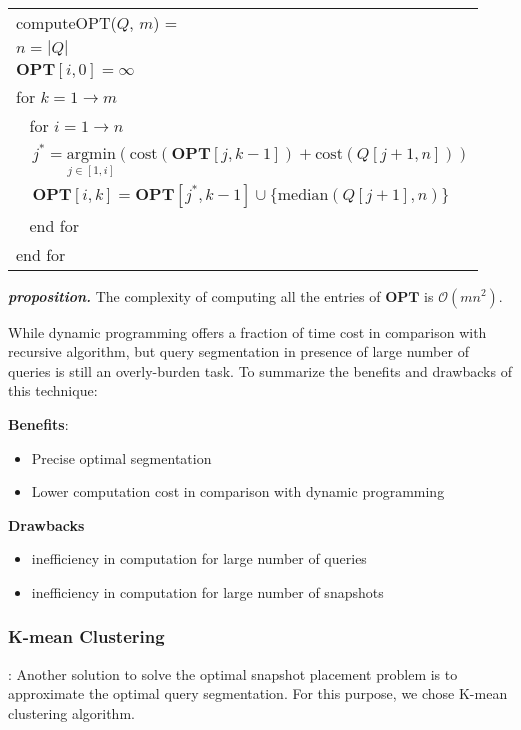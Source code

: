 \vspace{1em}
{\small
	\begin{tabular}{|l|} \hline
		computeOPT($Q$, $m$) = \\
		\verb|| $n = |Q|$ \\
		\verb|| $\mathbf{OPT}[i, 0] = \infty$ \\
		\verb|| for $k = 1 \to m$ \\
		\verb| | for $i = 1 \to n$ \\
		\verb|  | $j^* = \underset{j\in[1,i]}{\mathrm{argmin}}
		(\mathrm{cost}(\mathbf{OPT}[j,k-1]) + \mathrm{cost}(Q[j+1, n]))$ \\
		\verb|  | $\mathbf{OPT}[i,k] = \mathbf{OPT}[j^*, k-1] \cup \{\mathrm{median}(Q[j+1], n)\}$ \\
		\verb| | end for \\
		\verb|| end for \\ \hline
	\end{tabular}
}
\vspace{1em}

\textbf{\emph{proposition.}} The complexity of computing all the entries of $\mathbf{OPT}$ is $\mathcal{O}(mn^2)$.

While dynamic programming offers a fraction of time cost in comparison with recursive algorithm, but query segmentation in presence of large number of queries is still an overly-burden task. To summarize the benefits and drawbacks of this technique:

\textbf{Benefits}:
\begin{itemize}
	\item Precise optimal segmentation
	\item Lower computation cost in comparison with dynamic programming
\end{itemize}
\textbf{Drawbacks}
\begin{itemize}
	\item inefficiency in computation for large number of queries
	\item inefficiency in computation for large number of snapshots
\end{itemize}


\subsubsection{K-mean Clustering}:  Another solution to solve the optimal snapshot placement problem is to approximate the optimal query segmentation. For this purpose, we chose K-mean clustering algorithm. 

